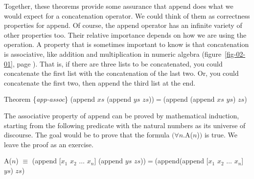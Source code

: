 Together, these theorems provide some assurance that \textsf{append} does what we
would expect for a concatenation operator.
We could think of them as
correctness properties
for \textsf{append}.
Of course, the \textsf{append} operator has
an infinite variety of other properties too.
Their relative importance depends on how we are using the operation.
A property that is sometimes important to know is that concatenation is associative,
like addition and multiplication in numeric algebra
(figure~\ref{fig-02-01}, page \pageref{fig-02-01}).
That is, if there are three lists to be concatenated,
you could concatenate the first list with the concatenation of the last two.
Or, you could concatenate the first two, then append the third list at the end.
\begin{samepage}
\label{app-assoc}
\begin{center}
Theorem \{\emph{app-assoc}\} \textsf{(append $xs$ (append $ys$ $zs$))}$=$\textsf{(append (append $xs$ $ys$) $zs$)}
\end{center}
\end{samepage}

The associative property of append can be proved by mathematical induction,
starting from the following predicate with the natural numbers as its
universe of discourse.
The goal would be to prove that the formula $(\forall n.$A($n$)$)$ is true.
We leave the proof as an exercise.
\begin{samepage}
\begin{center}
A($n$) $\equiv$ \textsf{(append [$x_1$ $x_2$ $\dots$ $x_n$] (append $ys$ $zs$))}$=$\textsf{(append(append [$x_1$ $x_2$ $\dots$ $x_n$] $ys$) $zs$)}
\end{center}
\end{samepage}


